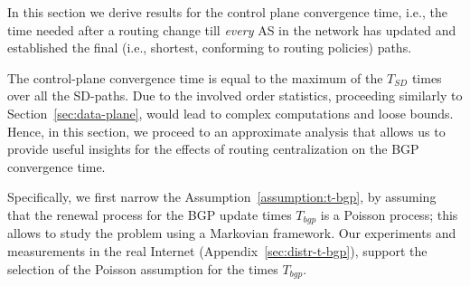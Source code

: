In this section we derive results for the control plane convergence time, i.e., the time needed after a routing change till \textit{every} AS in the network has updated and established the final (i.e., shortest, conforming to routing policies) paths.

The control-plane convergence time is equal to the maximum of the $T_{SD}$ times over all the SD-paths. Due to the involved order statistics, proceeding similarly to Section~\ref{sec:data-plane}, would lead to complex computations and loose bounds. Hence, in this section, we proceed to an approximate analysis that allows us to provide useful insights for the effects of routing centralization on the BGP convergence time. %


Specifically, we first narrow the Assumption~\ref{assumption:t-bgp}, by assuming that the renewal process for the BGP update times $T_{bgp}$ is a Poisson process; this allows to study the problem using a Markovian framework. %
Our experiments and measurements in the real Internet (Appendix~\ref{sec:distr-t-bgp}), support the selection of the Poisson assumption for the times $T_{bgp}$.


